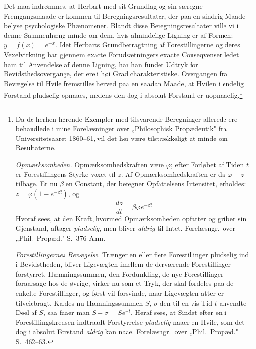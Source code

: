 \documentclass[12pt]{book}
\begin{document}
Det maa indrømmes, at Herbart med sit Grundlag og sin særegne Fremgangsmaade er kommen til
Beregningsresultater, der paa en sindrig Maade belyse psychologiske Phænomener. Blandt disse
Beregningsresultater ville vi i denne Sammenhæng minde om dem, hvis almindelige Ligning er af Formen:
$y = f(x) = e^{-x}$. Idet Herbarts Grundbetragtning af Forestillingerne og deres Vexelvirkning har
gjennem exacte Forudsætningers exacte Conseqvenser ledet ham til Anvendelse af denne Ligning, har han
fundet Udtryk for Bevidsthedsovergange, der ere i høi Grad charakteristiske. Overgangen fra Bevægelse
til Hvile fremstilles herved paa en saadan Maade, at Hvilen i endelig Forstand pludselig opnaaes,
medens den dog i absolut Forstand er uopnaaelig.\footnote{Da de herhen hørende Exempler med
tilsvarende Beregninger allerede ere behandlede i mine Forelæsninger over „Philosophisk
Propædeutik" fra Universitetsaaret 1860--61, vil det her være tilstrækkeligt at minde om
Resultaterne.

\emph{Opmærksomheden.} Opmærksomhedskraften være $\varphi$; efter Forløbet af Tiden $t$ er
Forestillingens Styrke voxet til $z$. Af Opmærksomhedskraften er da $\varphi - z$ tilbage. Er nu
$\beta$ en Constant, der betegner Opfattelsens Intensitet, erholdes: $z = \varphi(1 - e^{-\beta t})$,
og
\[ \frac{dz}{dt} = \beta\varphi e^{-\beta t} \] %
Hvoraf sees, at den Kraft, hvormed Opmærksomheden opfatter og griber sin Gjenstand, aftager
\emph{pludselig}, men bliver \emph{aldrig} til Intet. Forelæsngr.\ over „Phil.\ Propæd." S.~376 Anm.

\emph{Forestillingernes Bevægelse.} Trænger en eller flere Forestillinger pludselig ind i
Bevidstheden, bliver Ligevægten imellem de derværende Forestillinger forstyrret. Hæmningssummen, den
Fordunkling, de nye Forestillinger foraarsage hos de øvrige, virker nu som et Tryk, der skal fordeles
paa de enkelte Forestillinger, og først vil forsvinde, naar Ligevægten atter er tilveiebragt. Kaldes
nu Hæmningssummen $S$, $\sigma$ den til en vis Tid $t$ anvendte Deel af $S$, saa faaer man $S - \sigma
= Se^{-t}$. Heraf sees, at Sindet efter en i Forestillingskredsen indtraadt Forstyrrelse
\emph{pludselig} naaer en Hvile, som det dog i absolut Forstand \emph{aldrig} kan naae. Forelæsngr.\
over „Phil.\ Propæd." S.~462--63.

}
\end{document}
